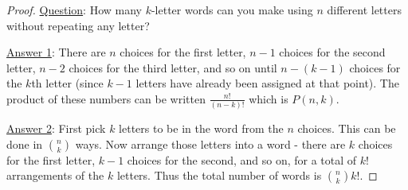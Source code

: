 \documentclass[10pt]{exam}
\begin{document}
\begin{questions}

\question \begin{proof}
           \underline{Question}: How many $k$-letter words can you make using $n$ different letters without repeating any letter?
           
           \underline{Answer 1}: There are $n$ choices for the first letter, $n-1$ choices for the second letter, $n-2$ choices for the third letter, and so on until $n - (k-1)$ choices for the $k$th letter (since $k-1$ letters have already been assigned at that point).  The product of these numbers can be written $\frac{n!}{(n-k)!}$ which is $P(n,k)$.
           
           \underline{Answer 2}: First pick $k$ letters to be in the word from the $n$ choices.  This can be done in ${n \choose k}$ ways.  Now arrange those letters into a word - there are $k$ choices for the first letter, $k-1$ choices for the second, and so on, for a total of $k!$ arrangements of the $k$ letters.  Thus the total number of words is ${n \choose k}k!$.
          \end{proof}

\end{questions}
\end{document}
